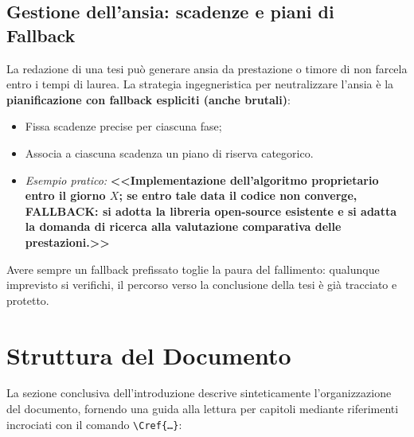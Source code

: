 \subsection*{Gestione dell'ansia: scadenze e piani di Fallback}
La redazione di una tesi può generare ansia da prestazione o timore di non farcela entro i tempi di laurea. La strategia ingegneristica per neutralizzare l'ansia è la \textbf{pianificazione con fallback espliciti (anche brutali)}:
\begin{itemize}
    \item Fissa scadenze precise per ciascuna fase;
    \item Associa a ciascuna scadenza un piano di riserva categorico. 
    \item \emph{Esempio pratico:} \textbf{<<Implementazione dell'algoritmo proprietario entro il giorno $X$; se entro tale data il codice non converge, FALLBACK: si adotta la libreria open-source esistente e si adatta la domanda di ricerca alla valutazione comparativa delle prestazioni.>>}
\end{itemize}
Avere sempre un fallback prefissato toglie la paura del fallimento: qualunque imprevisto si verifichi, il percorso verso la conclusione della tesi è già tracciato e protetto.


\section{Struttura del Documento}
\label{sec:struttura-tesi}

La sezione conclusiva dell'introduzione descrive sinteticamente l'organizzazione del documento, fornendo una guida alla lettura per capitoli mediante riferimenti incrociati con il comando \texttt{\textbackslash Cref\{\dots\}}:

